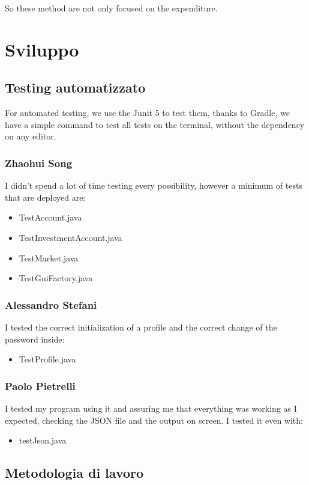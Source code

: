 \documentclass[a4paper,12pt]{report}
\begin{document}
	So these method are not only focused on the expenditure.
	
	 

\chapter{Sviluppo}
\section{Testing automatizzato}
For automated testing, we use the Junit 5 to test them, thanks to Gradle, we have a simple command to test all tests on the terminal, without the dependency on any editor. 

\subsection{Zhaohui Song}
I didn't spend a lot of time testing every possibility, however a minimum of tests that are deployed are:
\begin{itemize}
    \item TestAccount.java
    \item TestInvestmentAccount.java
    \item TestMarket.java
    \item TestGuiFactory.java
\end{itemize}

\subsection{Alessandro Stefani}
I tested the correct initialization of a profile and the correct change of the password inside:
\begin{itemize}
    \item TestProfile.java
\end{itemize}

\subsection{Paolo Pietrelli}
I tested my program using it and assuring me that everything was working as I expected, checking the JSON file and the output on screen.
I tested it even with:
\begin{itemize}
    \item testJson.java
\end{itemize}

\section{Metodologia di lavoro}
\end{document}

